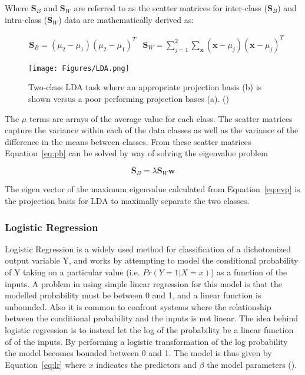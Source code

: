 \documentclass{article}
\begin{document}
Where $\mathbf{S}_{B}$ and $\mathbf{S}_{W}$ are referred to as the scatter matrices for inter-class ($\mathbf{S}_{B}$) and intra-class ($\mathbf{S}_{W}$) data are mathematically derived as:

\begin{equation}\label{eq:scat}
\begin{aligned}
&\mathbf{S}_{B} = (\mu_{2} - \mu_{1})(\mu_{2} - \mu_{1})^{T}
&\mathbf{S}_{W} =\sum_{j=1}^{2}\sum_{\mathbf{x}}^{ }(\mathbf{x} - \mu_{j})(\mathbf{x} - \mu_{j})^{T}
\end{aligned}
\end{equation}

\begin{figure}[b]
    \centering
    \texttt{[image: Figures/LDA.png]}
    \caption{Two-class LDA task where an appropriate projection basis (b) is shown versus a poor performing projection bases (a). (\cite{kutz_2013})}
    \label{fig:lda}
\end{figure}

The $\mu$ terms are arrays of the average value for each class. The scatter matrices capture the variance within each of the data classes as well as the variance of the difference in the means between classes. From these scatter matrices Equation~\ref{eq:pb} can be solved by way of solving the eigenvalue problem

\begin{equation}\label{eq:evp}
\mathbf{S}_{B} = \lambda\mathbf{S}_{W}\mathbf{w}
\end{equation}

The eigen vector of the maximum eigenvalue calculated from Equation~\ref{eq:evp} is the projection basis for LDA to maximally separate the two classes.

\subsubsection{Logistic Regression}
Logistic Regression is a widely used method for classification of a dichotomized output variable Y, and works by attempting to model the conditional probability of Y taking on a particular value (i.e. $Pr(Y = 1|X = x)$) as a function of the inputs. A problem in using simple linear regression for this model is that the modelled probability must be between 0 and 1, and a linear function is unbounded. Also it is common to confront systems where the relationship between the conditional probability and the inputs is not linear. The idea behind logistic regression is to instead let the log of the probability be a linear function of of the inputs. By performing a logistic transformation of the log probability the model becomes bounded between 0 and 1. The model is thus given by Equation~\ref{eq:lr} where $x$ indicates the predictors and $\beta$ the model parameters (\cite{Shalizi2012AdvancedDA}).
\end{document}
